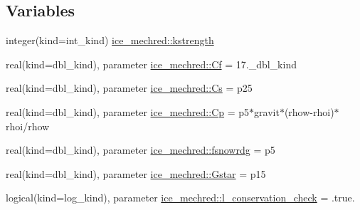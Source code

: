 \subsection*{Variables}
\begin{DoxyCompactItemize}
\item 
integer(kind=int\_\-kind) \hyperlink{namespaceice__mechred_a2272185e4ee38f92dbb9908fca1dac0a}{ice\_\-mechred::kstrength}
\item 
real(kind=dbl\_\-kind), parameter \hyperlink{namespaceice__mechred_ae649373b3c64951beea9cf6d3436124a}{ice\_\-mechred::Cf} = 17.\_\-dbl\_\-kind
\item 
real(kind=dbl\_\-kind), parameter \hyperlink{namespaceice__mechred_a0cca318f045e71a7ff69619f4186399c}{ice\_\-mechred::Cs} = p25
\item 
real(kind=dbl\_\-kind), parameter \hyperlink{namespaceice__mechred_ae1333fb1d2c19a54662644143d18489c}{ice\_\-mechred::Cp} = p5$\ast$gravit$\ast$(rhow-\/rhoi)$\ast$rhoi/rhow
\item 
real(kind=dbl\_\-kind), parameter \hyperlink{namespaceice__mechred_a528a8cc57e3a5cb9d679d26baa6cec27}{ice\_\-mechred::fsnowrdg} = p5
\item 
real(kind=dbl\_\-kind), parameter \hyperlink{namespaceice__mechred_a85e0edec0423e8de65aaa8ddfa61d02e}{ice\_\-mechred::Gstar} = p15
\item 
logical(kind=log\_\-kind), parameter \hyperlink{namespaceice__mechred_a28f8598357ef3851a6288dfdd581732d}{ice\_\-mechred::l\_\-conservation\_\-check} = .true.
\end{DoxyCompactItemize}
